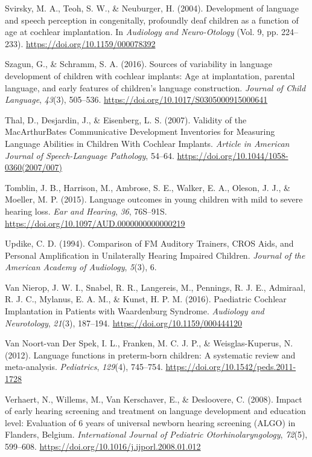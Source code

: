 \documentclass[
  english,
  man]{apa6}
\begin{document}
\leavevmode\hypertarget{ref-svirsky2004}{}%
Svirsky, M. A., Teoh, S. W., \& Neuburger, H. (2004). Development of language and speech perception in congenitally, profoundly deaf children as a function of age at cochlear implantation. In \emph{Audiology and Neuro-Otology} (Vol. 9, pp. 224--233). \url{https://doi.org/10.1159/000078392}

\leavevmode\hypertarget{ref-szagun2016}{}%
Szagun, G., \& Schramm, S. A. (2016). Sources of variability in language development of children with cochlear implants: Age at implantation, parental language, and early features of children's language construction. \emph{Journal of Child Language}, \emph{43}(3), 505--536. \url{https://doi.org/10.1017/S0305000915000641}

\leavevmode\hypertarget{ref-thal2007}{}%
Thal, D., Desjardin, J., \& Eisenberg, L. S. (2007). Validity of the MacArthurBates Communicative Development Inventories for Measuring Language Abilities in Children With Cochlear Implants. \emph{Article in American Journal of Speech-Language Pathology}, 54--64. \url{https://doi.org/10.1044/1058-0360(2007/007)}

\leavevmode\hypertarget{ref-tomblin2015}{}%
Tomblin, J. B., Harrison, M., Ambrose, S. E., Walker, E. A., Oleson, J. J., \& Moeller, M. P. (2015). Language outcomes in young children with mild to severe hearing loss. \emph{Ear and Hearing}, \emph{36}, 76S--91S. \url{https://doi.org/10.1097/AUD.0000000000000219}

\leavevmode\hypertarget{ref-updike1994}{}%
Updike, C. D. (1994). Comparison of FM Auditory Trainers, CROS Aids, and Personal Amplification in Unilaterally Hearing Impaired Children. \emph{Journal of the American Academy of Audiology}, \emph{5}(3), 6.

\leavevmode\hypertarget{ref-vannierop2016}{}%
Van Nierop, J. W. I., Snabel, R. R., Langereis, M., Pennings, R. J. E., Admiraal, R. J. C., Mylanus, E. A. M., \& Kunst, H. P. M. (2016). Paediatric Cochlear Implantation in Patients with Waardenburg Syndrome. \emph{Audiology and Neurotology}, \emph{21}(3), 187--194. \url{https://doi.org/10.1159/000444120}

\leavevmode\hypertarget{ref-vannoort-vanderspek2012}{}%
Van Noort-van Der Spek, I. L., Franken, M. C. J. P., \& Weisglas-Kuperus, N. (2012). Language functions in preterm-born children: A systematic review and meta-analysis. \emph{Pediatrics}, \emph{129}(4), 745--754. \url{https://doi.org/10.1542/peds.2011-1728}

\leavevmode\hypertarget{ref-verhaert2008}{}%
Verhaert, N., Willems, M., Van Kerschaver, E., \& Desloovere, C. (2008). Impact of early hearing screening and treatment on language development and education level: Evaluation of 6 years of universal newborn hearing screening (ALGO) in Flanders, Belgium. \emph{International Journal of Pediatric Otorhinolaryngology}, \emph{72}(5), 599--608. \url{https://doi.org/10.1016/j.ijporl.2008.01.012}
\end{document}
